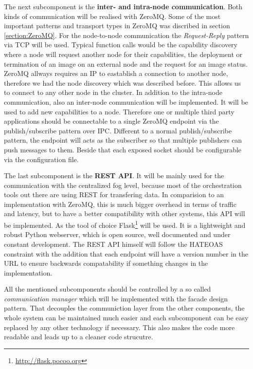 The next subcomponent is the \textbf{inter- and intra-node communication}.
Both kinds of communication will be realised with ZeroMQ.
Some of the most important patterns and transport types in ZeroMQ was discribed in section \ref{section:ZeroMQ}.
For the node-to-node communication the \textit{Request-Reply} pattern via \ac{TCP} will be used.
Typical function calls would be the capability discovery where a node will request another node for their capabilities, the deployment or termination of an image on an external node and the request for an image status.
ZeroMQ allways requires an \ac{IP} to eastablish a connection to another node, therefore we had the node discovery which was described before.
This allows us to connect to any other node in the cluster.
In addition to the intra-node communication, also an inter-node communication will be implemented.
It will be used to add new capabilities to a node.
Therefore one or multiple third party applications should be connectable to a single ZeroMQ endpoint via the publish/subscribe pattern over \ac{IPC}.
Different to a normal publish/subscribe pattern, the endpoint will acts as the subscriber so that multiple publishers can push messages to them.
Beside that each exposed socket should be configurable via the configuration file.

The last subcomponent is the \textbf{\ac{REST} \ac{API}}.
It will be mainly used for the communication with the centralized fog level, because most of the orchestration tools out there are using \ac{REST} for transfering data.
In comparision to an implementation with ZeroMQ, this is much bigger overhead in terms of traffic and latency, but to have a better compatibility with other systems, this \ac{API} will be implemented.
As the tool of choice Flask\footnote{\url{http://flask.pocoo.org}} will be used.
It is a lightweight and robust Python webserver, which is open source, well documented and under constant development.
The \ac{REST} \ac{API} himself will follow the \ac{HATEOAS} constraint with the addition that each endpoint will have a version number in the \ac{URL} to ensure backwards compatability if something changes in the implementation.

All the mentioned subcomponents should be controlled by a so called \textit{communication manager} which will be implemented with the facade design pattern.
That decouples the communiction layer from the other components, the whole system can be maintained much easier and each subcomponent can be easy replaced by any other technology if necessary.
This also makes the code more readable and leads up to a cleaner code strucutre.



